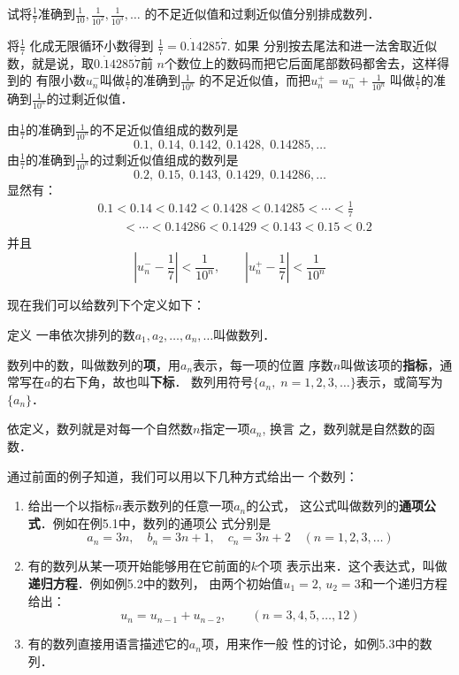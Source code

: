 \begin{example}
    试将$\frac{1}{7}$准确到$\frac{1}{10},\frac{1}{10^2},\frac{1}{10^3},\ldots$
的不足近似值和过剩近似值分别排成数列．
\end{example}

\begin{solution}
    将$\frac{1}{7}$
化成无限循环小数得到
$\frac{1}{7}=0.\dot{1}4285\dot{7}$. 如果
分别按去尾法和进一法舍取近似数，就是说，取$0.\dot{1}4285\dot{7}$前
$n$个数位上的数码而把它后面尾部数码都舍去，这样得到的
有限小数$u_n^-$叫做$\frac{1}{7}$的准确到$\frac{1}{10^n}$
的不足近似值，而把$u_n^+=u_n^-+\frac{1}{10^n}$
叫做$\frac{1}{7}$的准确到$\frac{1}{10^n}$的过剩近似值．

由$\frac{1}{7}$的准确到$\frac{1}{10^n}$的不足近似值组成的数列是
\[0.1,\; 0.14,\; 0.142,\; 0.1428,\; 0.14285,\ldots\]
由$\frac{1}{7}$的准确到$\frac{1}{10^n}$的过剩近似值组成的数列是
\[0.2,\; 0.15,\; 0.143,\; 0.1429,\; 0.14286,\ldots\]
显然有：
\[\begin{split}
   & 0.1<0.14<0.142<0.1428<0.14285<\cdots<\frac{1}{7}\\
   &\qquad <\cdots<
0.14286<0.1429<0.143<0.15<0.2
\end{split}\]
并且
\[\left|u_n^--\frac{1}{7} \right|<\frac{1}{10^n},\qquad \left|u_n^+-\frac{1}{7} \right|<\frac{1}{10^n}\]
\end{solution}

现在我们可以给数列下个定义如下：
\begin{blk}{定义}
    一串依次排列的数$a_1,a_2,\ldots,a_n,\ldots$叫做数列．

    数列中的数，叫做数列的\textbf{项}，用$a_n$表示，每一项的位置
序数$n$叫做该项的\textbf{指标}，通常写在$a$的右下角，故也叫\textbf{下标}．
数列用符号$\{a_n,\; n=1,2,3,\ldots\}$表示，或简写为$\{a_n\}$．
\end{blk}

依定义，数列就是对每一个自然数$n$指定一项$a_n$, 换言
之，数列就是自然数的函数．

通过前面的例子知道，我们可以用以下几种方式给出一
个数列：
\begin{enumerate}
\item 给出一个以指标$n$表示数列的任意一项$a_n$的公式，
这公式叫做数列的\textbf{通项公式}．例如在例5.1中，数列的通项公
式分别是
\[a_n=3n,\quad b_n=3n+1,\quad c_n=3n+2 \quad (n=1,2,3,\ldots)\]
\item 有的数列从某一项开始能够用在它前面的$k$个项
表示出来．这个表达式，叫做\textbf{递归方程}．例如例5.2中的数列，
由两个初始值$u_1=2$, $u_2=3$和一个递归方程给出：
\[u_n=u_{n-1}+u_{n-2},\qquad (n=3,4,5,\ldots,12)\]
\item 有的数列直接用语言描述它的$a_n$项，用来作一般
性的讨论，如例5.3中的数列．
\end{enumerate}

